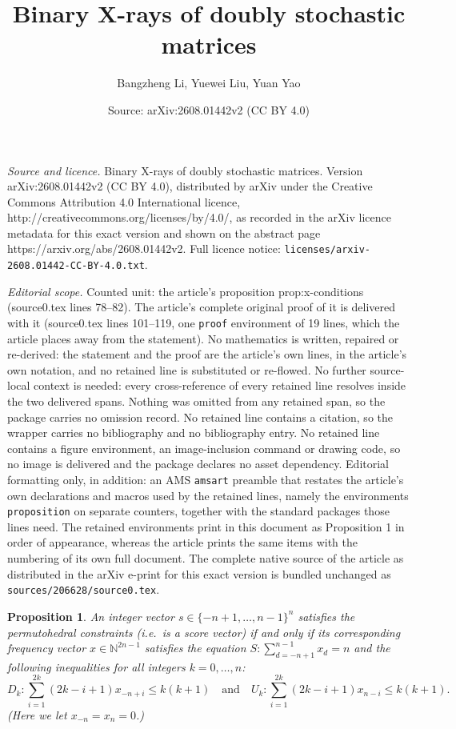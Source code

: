 \documentclass[10pt,a4paper]{amsart}
\title{Binary X-rays of doubly stochastic matrices}
\author{Bangzheng Li, Yuewei Liu, Yuan Yao}
\date{Source: arXiv:2608.01442v2 (CC BY 4.0)}
\newtheorem{proposition}{Proposition}
\begin{document}
\maketitle

\noindent\emph{Source and licence.} Binary X-rays of doubly stochastic matrices. Version arXiv:2608.01442v2 (CC BY 4.0), distributed by arXiv under the Creative Commons Attribution 4.0 International licence, http://creativecommons.org/licenses/by/4.0/, as recorded in the arXiv licence metadata for this exact version and shown on the abstract page https://arxiv.org/abs/2608.01442v2. Full licence notice: \texttt{licenses/arxiv-2608.01442-CC-BY-4.0.txt}.\par\smallskip

\noindent\textit{Editorial scope.} Counted unit: the article's proposition prop:x-conditions (source0.tex lines 78--82). The article's complete original proof of it is delivered with it (source0.tex lines 101--119, one \texttt{proof} environment of 19 lines, which the article places away from the statement). No mathematics is written, repaired or re-derived: the statement and the proof are the article's own lines, in the article's own notation, and no retained line is substituted or re-flowed.  No further source-local context is needed: every cross-reference of every retained line resolves inside the two delivered spans.  Nothing was omitted from any retained span, so the package carries no omission record.  No retained line contains a citation, so the wrapper carries no bibliography and no bibliography entry.  No retained line contains a figure environment, an image-inclusion command or drawing code, so no image is delivered and the package declares no asset dependency.  Editorial formatting only, in addition: an AMS \texttt{amsart} preamble that restates the article's own declarations and macros used by the retained lines, namely the environments \texttt{proposition} on separate counters, together with the standard packages those lines need.  The retained environments print in this document as Proposition 1 in order of appearance, whereas the article prints the same items with the numbering of its own full document.  The complete native source of the article as distributed in the arXiv e-print for this exact version is bundled unchanged as \texttt{sources/206628/source0.tex}.
\begin{proposition}\label{prop:x-conditions}
    An integer vector $s\in \{-n+1, \dots, n-1\}^n$ satisfies the permutohedral constraints (i.e.\ is a score vector) if and only if its corresponding frequency vector $x\in \mathbb{N}^{2n-1}$ satisfies the equation $S: \sum_{d=-n+1}^{n-1} x_d = n$ and the following inequalities for all integers $k = 0, \dots, n$: 
        \[D_k: \sum_{i=1}^{2k} (2k-i+1) x_{-n+i} \leq k(k+1) \quad \text{and} \quad U_k: \sum_{i=1}^{2k} (2k-i+1) x_{n-i}\leq k(k+1).\]
    (Here we let $x_{-n} = x_n = 0$.)
\end{proposition}
\end{document}
